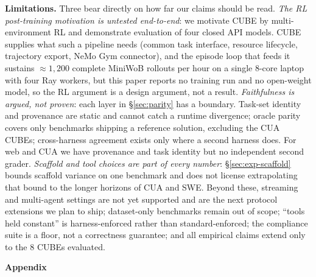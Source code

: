 \documentclass{article}
\newcommand{\NUMEXP}{8}               %
\newcommand{\mypar}[1]{\par\noindent\textbf{#1}\enspace}
\begin{document}
\mypar{Limitations.}
Three bear directly on how far our claims should be read.
\emph{The RL post-training motivation is untested end-to-end}: we motivate CUBE
by multi-environment RL and demonstrate evaluation of four closed API models.
CUBE supplies what such a pipeline needs (common task interface, resource
lifecycle, trajectory export, NeMo Gym connector), and the episode loop that
feeds it sustains ${\approx}1{,}200$ complete MiniWoB rollouts per hour on a
single 8-core laptop with four Ray workers, but this paper reports no training
run and no open-weight model, so the RL argument is a design argument, not a
result.
\emph{Faithfulness is argued, not proven}: each layer in \S\ref{sec:parity} has
a boundary. Task-set identity and provenance are static and cannot catch a
runtime divergence; oracle parity covers only benchmarks shipping a reference
solution, excluding the CUA CUBEs; cross-harness agreement exists only where a
second harness does. For web and CUA we have provenance and task identity but
no independent second grader.
\emph{Scaffold and tool choices are part of every number}:
\S\ref{sec:exp-scaffold} bounds scaffold variance on one benchmark and does not
license extrapolating that bound to the longer horizons of CUA and SWE.
Beyond these, streaming and multi-agent settings are not yet supported and are
the next protocol extensions we plan to ship; dataset-only benchmarks remain
out of scope; ``tools held constant'' is harness-enforced rather than
standard-enforced; the compliance suite is a floor, not a correctness
guarantee; and all empirical claims extend only to the \NUMEXP{} CUBEs
evaluated.





\ifshowchecklist

\fi


\newpage

\appendix

\begin{center}
  {\LARGE\textbf{Appendix}}
\end{center}
\vspace{1em}
\end{document}
